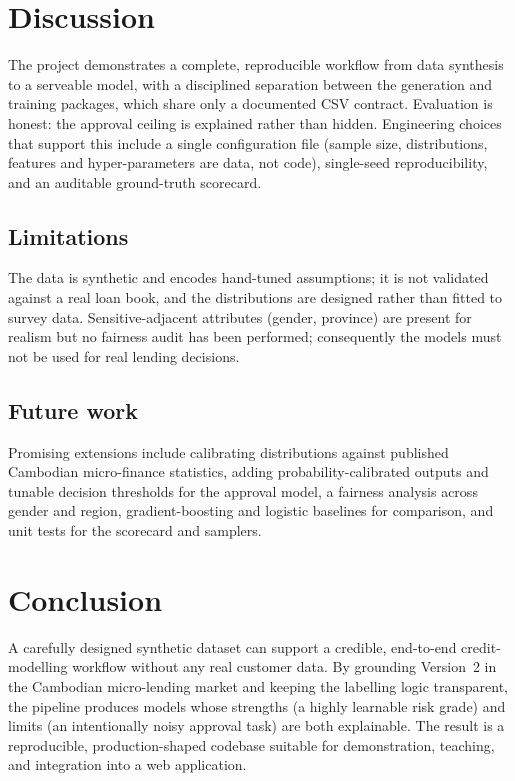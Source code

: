\documentclass[conference]{IEEEtran}
\begin{document}
\section{Discussion}

The project demonstrates a complete, reproducible workflow from data synthesis
to a serveable model, with a disciplined separation between the generation and
training packages, which share only a documented CSV contract. Evaluation is
honest: the approval ceiling is explained rather than hidden. Engineering choices
that support this include a single configuration file (sample size,
distributions, features and hyper-parameters are data, not code),
single-seed reproducibility, and an auditable ground-truth scorecard.

\subsection{Limitations}
The data is synthetic and encodes hand-tuned assumptions; it is not validated
against a real loan book, and the distributions are designed rather than fitted
to survey data. Sensitive-adjacent attributes (gender, province) are present for
realism but no fairness audit has been performed; consequently the models must
not be used for real lending decisions.

\subsection{Future work}
Promising extensions include calibrating distributions against published
Cambodian micro-finance statistics, adding probability-calibrated outputs and
tunable decision thresholds for the approval model, a fairness analysis across
gender and region, gradient-boosting and logistic baselines for comparison, and
unit tests for the scorecard and samplers.

\section{Conclusion}

A carefully designed synthetic dataset can support a credible, end-to-end
credit-modelling workflow without any real customer data. By grounding Version~2
in the Cambodian micro-lending market and keeping the labelling logic
transparent, the pipeline produces models whose strengths (a highly learnable
risk grade) and limits (an intentionally noisy approval task) are both
explainable. The result is a reproducible, production-shaped codebase suitable
for demonstration, teaching, and integration into a web application.
\end{document}
